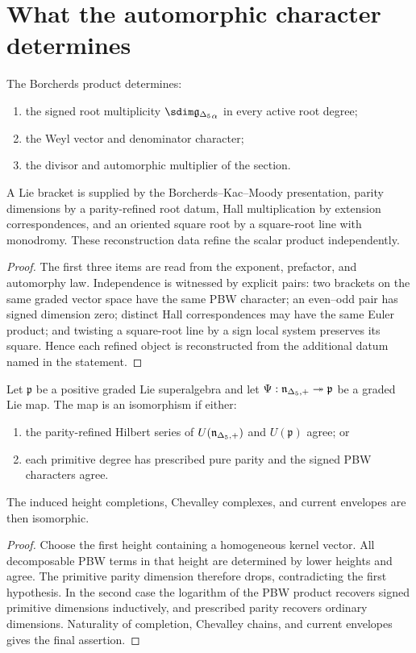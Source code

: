 \chapter{What the automorphic character determines}
\begin{theorem}
The Borcherds product determines:
\begin{enumerate}
\item the signed root multiplicity $\sdim\gIg_\alpha$ in every active root degree;
\item the Weyl vector and denominator character;
\item the divisor and automorphic multiplier of the section.
\end{enumerate}
A Lie bracket is supplied by the Borcherds--Kac--Moody presentation, parity dimensions by a parity-refined root datum, Hall multiplication by extension correspondences, and an oriented square root by a square-root line with monodromy.  These reconstruction data refine the scalar product independently.
\end{theorem}
\begin{proof}
The first three items are read from the exponent, prefactor, and automorphy law.  Independence is witnessed by explicit pairs: two brackets on the same graded vector space have the same PBW character; an even--odd pair has signed dimension zero; distinct Hall correspondences may have the same Euler product; and twisting a square-root line by a sign local system preserves its square.  Hence each refined object is reconstructed from the additional datum named in the statement.
\end{proof}

\begin{recognition}
Let $\mathfrak p$ be a positive graded Lie superalgebra and let $\Psi:{\mathfrak n_{\Delta_5,+}}\twoheadrightarrow\mathfrak p$ be a graded Lie map.  The map is an isomorphism if either:
\begin{enumerate}
\item the parity-refined Hilbert series of $U({\mathfrak n_{\Delta_5,+}})$ and $U(\mathfrak p)$ agree; or
\item each primitive degree has prescribed pure parity and the signed PBW characters agree.
\end{enumerate}
The induced height completions, Chevalley complexes, and current envelopes are then isomorphic.
\end{recognition}
\begin{proof}
Choose the first height containing a homogeneous kernel vector.  All decomposable PBW terms in that height are determined by lower heights and agree.  The primitive parity dimension therefore drops, contradicting the first hypothesis.  In the second case the logarithm of the PBW product recovers signed primitive dimensions inductively, and prescribed parity recovers ordinary dimensions.  Naturality of completion, Chevalley chains, and current envelopes gives the final assertion.
\end{proof}

